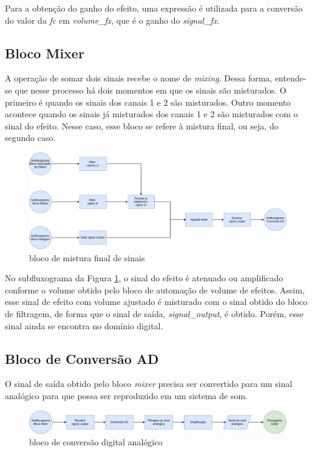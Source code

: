 Para a obtenção do ganho do efeito, uma expressão é utilizada para a conversão do valor da \textit{fc} em \textit{volume\_fx}, que é o ganho do \textit{signal\_fx}.


\subsection{Bloco Mixer}

A operação de somar dois sinais recebe o nome de \textit{mixing}. Dessa forma, entende-se que nesse processo há dois momentos em que os sinais são misturados. O primeiro é quando os sinais dos canais 1 e 2 são misturados. Outro momento acontece quando os sinais já misturados dos canais 1 e 2 são misturados com o sinal do efeito. Nesse caso, esse bloco se refere à mistura final, ou seja, do segundo caso.

    \begin{figure}[h]
        \centering
        \includegraphics[width=\textwidth]{figuras/fig58.png}
        \caption{bloco de mistura final de sinais}
        \label{fig58}
    \end{figure}

No subfluxograma da Figura \ref{fig58}, o sinal do efeito é atenuado ou amplificado conforme o volume obtido pelo bloco de automação de volume de efeitos. Assim, esse sinal de efeito com volume ajustado é misturado com o sinal obtido do bloco de filtragem, de forma que o sinal de saída, \textit{signal\_output}, é obtido. Porém, esse sinal ainda se encontra no domínio digital.


\subsection{Bloco de Conversão AD}

O sinal de saída obtido pelo bloco \textit{mixer} precisa ser convertido para um sinal analógico para que possa ser reproduzido em um sistema de som.

    \begin{figure}[h]
        \centering
        \includegraphics[width=\textwidth]{figuras/fig59.png}
        \caption{bloco de conversão digital analógico}
        \label{fig59}
    \end{figure}

